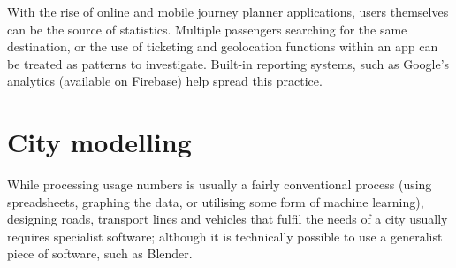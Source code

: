 With the rise of online and mobile journey planner applications, users themselves can be the source of statistics. Multiple passengers searching for the same destination, or the use of ticketing and geolocation functions within an app can be treated as patterns to investigate. Built-in reporting systems, such as Google's analytics (available on Firebase) help spread this practice.

\section{City modelling}

While processing usage numbers is usually a fairly conventional process (using spreadsheets, graphing the data, or utilising some form of machine learning), designing roads, transport lines and vehicles that fulfil the needs of a city usually requires specialist software; although it is technically possible to use a generalist piece of software, such as Blender. 

